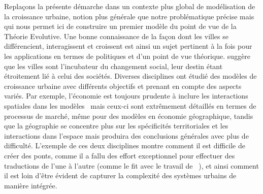 {Replaçons la présente démarche dans un contexte plus global de modélisation de la croissance urbaine, notion plus générale que notre problématique précise mais qui nous permet ici de construire un premier modèle du point de vue de la Théorie Evolutive. Une bonne connaissance de la façon dont les villes se différencient, interagissent et croissent est ainsi un sujet pertinent à la fois pour les applications en termes de politiques et d'un point de vue théorique. \cite{pumain2009innovation} suggère que les villes sont l'incubateur du changement social, leur destin étant étroitement lié à celui des sociétés. Diverses disciplines ont étudié des modèles de croissance urbaine avec différents objectifs et prenant en compte des aspects variés. Par exemple, l'économie est toujours prudente à inclure les interactions spatiales dans les modèles~\cite{krugman1998space} mais ceux-ci sont extrêmement détaillés en termes de processus de marché, même pour des modèles en économie géographique, tandis que la géographie se concentre plus sur les spécificités territoriales et les interactions dans l'espace mais produira des conclusions générales avec plus de difficulté. L'exemple de ces deux disciplines montre comment il est difficile de créer des ponts, comme il a fallu des effort exceptionnel pour effectuer des traductions de l'une à l'autre (comme  le fit avec le travail de ~\cite{taylor2016polymath}), et ainsi comment il est loin d'être évident de capturer la complexité des systèmes urbains de manière intégrée.
}



